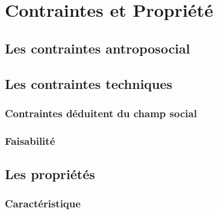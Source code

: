\chapter{Contraintes et Propriété}

\section{Les contraintes antroposocial}




\section{Les contraintes techniques}

\subsection{Contraintes déduitent du champ social}


\subsection{Faisabilité}


\section{Les propriétés}
\subsection{Caractéristique}

